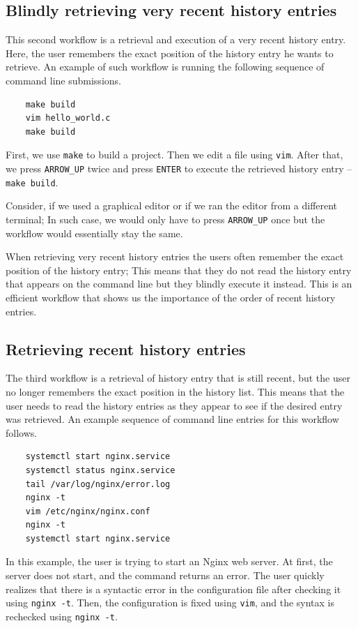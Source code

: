 \subsection{Blindly retrieving very recent history entries}\label{workflow-blind-retrieval}

This second workflow is a retrieval and execution of a very recent history entry. Here, the user remembers the exact position of the history entry he wants to retrieve. An example of such workflow is running the following sequence of command line submissions.
\begin{verbatim}
    make build
    vim hello_world.c
    make build
\end{verbatim}
First, we use \verb|make| to build a project. Then we edit a file using \verb|vim|. After that, we press \verb|ARROW_UP| twice and press \verb|ENTER| to execute the retrieved history entry -- \verb|make build|. 


Consider, if we used a graphical editor or if we ran the editor from a different terminal; In such case, we would only have to press \verb|ARROW_UP| once but the workflow would essentially stay the same.

When retrieving very recent history entries the users often remember the exact position of the history entry; This means that they do not read the history entry that appears on the command line but they blindly execute it instead. This is an efficient workflow that shows us the importance of the order of recent history entries.

\subsection{Retrieving recent history entries}\label{workflow-recent-history-arrow-up}
The third workflow is a retrieval of history entry that is still recent, but the user no longer remembers the exact position in the history list. This means that the user needs to read the history entries as they appear to see if the desired entry was retrieved. An example sequence of command line entries for this workflow follows.

\begin{verbatim}
    systemctl start nginx.service
    systemctl status nginx.service
    tail /var/log/nginx/error.log
    nginx -t
    vim /etc/nginx/nginx.conf
    nginx -t
    systemctl start nginx.service
\end{verbatim}

In this example, the user is trying to start an Nginx \cite{reese2008nginx} web server. At first, the server does not start, and the command returns an error. The user quickly realizes that there is a syntactic error in the configuration file after checking it using \verb|nginx -t|. Then, the configuration is fixed using \verb|vim|, and the syntax is rechecked using \verb|nginx -t|. 

